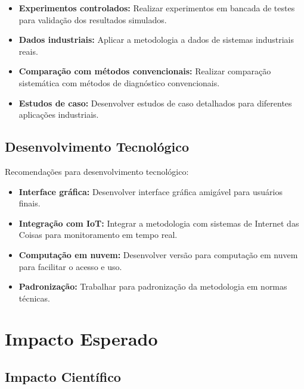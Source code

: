 \begin{itemize}
    \item \textbf{Experimentos controlados:} Realizar experimentos em bancada de testes para validação dos resultados simulados.
    
    \item \textbf{Dados industriais:} Aplicar a metodologia a dados de sistemas industriais reais.
    
    \item \textbf{Comparação com métodos convencionais:} Realizar comparação sistemática com métodos de diagnóstico convencionais.
    
    \item \textbf{Estudos de caso:} Desenvolver estudos de caso detalhados para diferentes aplicações industriais.
\end{itemize}

\subsection{Desenvolvimento Tecnológico}

Recomendações para desenvolvimento tecnológico:

\begin{itemize}
    \item \textbf{Interface gráfica:} Desenvolver interface gráfica amigável para usuários finais.
    
    \item \textbf{Integração com IoT:} Integrar a metodologia com sistemas de Internet das Coisas para monitoramento em tempo real.
    
    \item \textbf{Computação em nuvem:} Desenvolver versão para computação em nuvem para facilitar o acesso e uso.
    
    \item \textbf{Padronização:} Trabalhar para padronização da metodologia em normas técnicas.
\end{itemize}

\section{Impacto Esperado}

\subsection{Impacto Científico}

